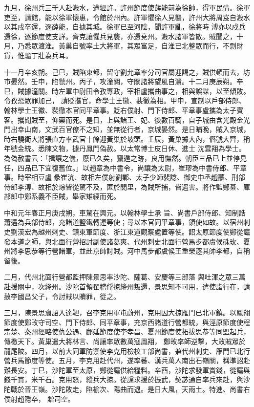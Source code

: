 \begin{pinyinscope}
 九月，徐州兵三千人赴溵水，途經許。許州節度使薛能前為徐帥，得軍民情。徐軍吏至，請館，能以徐軍懷惠，令館於州內。許軍懼徐人見襲，許州大將周岌自溵水以其戍卒還，逐薛能，自據其城。徐軍已至河陰，聞許軍亂，徐將時
 溥亦以戍兵還徐，逐節度使支詳。齊克讓懼兵見襲，亦還兗州。溵水諸軍皆散。賊聞之，十月，乃悉眾渡淮。黃巢自號率土大將軍，其眾富足，自淮已北整眾而行，不剽財貨，惟驅丁壯為兵耳。



 十一月辛亥朔。己巳，賊陷東都，留守劉允章率分司官屬迎謁之，賊供頓而去，坊市晏然。壬申，陷虢州。丙子，攻潼關，守關諸將望風自潰。十二月庚辰朔。辛巳，賊據潼關。時左軍中尉田令孜專政，宰相盧攜曲事之，相與誤謀，以至傾敗。令孜恐眾罪加己，
 請貶攜官，命學士王徽、裴徹為相。甲申，宣制以戶部侍郎、翰林學士王徽、裴徹本官同平章事。貶右僕射、門下侍郎、平章事盧攜為太子賓客。攜聞賊至，仰藥而死。是日，上與諸王、妃、後數百騎，自子城由含光殿金光門出幸山南，文武百官僚不之知，並無從行者，京城晏然。是日晡晚，賊入京城，時右驍衛大將張直方率武官十餘迎黃巢於坡頭。壬辰，黃巢據大內，僭號大齊，稱年號金統。悉陳文物，據丹鳳門偽赦。以太常博士皮日休、進士
 沈雲翔為學士。為偽赦書云：「揖讓之儀，廢已久矣，竄遁之跡，良用憮然。朝臣三品已上並停見任，四品已下宜復舊位。」以趙章為中書令，尚讓為太尉，崔璆為中書侍郎、平章事。時宰相豆盧彖崔沆、故相左僕射劉鄴、太子少師裴諗、御史中丞趙蒙、刑部侍郎李溥、故相於琮皆從駕不及，匿於閭里，為賊所捕，皆遇害。將作監鄭綦、庫部郎中鄭系義不臣賊，舉家雉經而死。



 中和元年春正月庚戌朔，車駕在興元。以翰林學士承
 旨、尚書戶部侍郎、知制誥蕭遘為兵部侍郎，充諸道鹽鐵轉運等使；尋以本官同平章事，領使如故。以宿州刺史劉漢宏為越州刺史、鎮東軍節度、浙江東道觀察處置等使。詔太原節度使鄭從讜發本道之師，與北面行營招討副使諸葛爽、代州刺史北面行營馬步都虞候硃玫、夏州將李思恭等行營諸軍，並赴京師討賊。河中馬步都虞候王重榮逐其帥李都，自稱留後。



 二月，代州北面行營都監押陳景思率沙陀、薩葛、安慶等三部落
 與吐渾之眾三萬赴援關中，次絳州。沙陀首領翟稽俘掠絳州叛還，景思知不可用，遣使詣行在，請赦李國昌父子，令討賊以贖罪，從之。



 三月，陳景思齎詔入達靼，召李克用軍屯蔚州，克用因大掠雁門已北軍鎮。以鳳翔節度使鄭畋守司空、門下侍郎、同平章事，充京西諸道行營都統，與涇原節度使程宗楚、秦州經略使仇公遇、鄜延節度使李孝昌、夏州節度使拓拔思恭等同盟起兵，傳檄天下。黃巢遣大將林言、尚讓率眾數萬寇鳳翔，
 鄭畋率師逆擊，大敗賊眾於龍尾陂。四月，以前大同軍防禦使李克用檢校工部尚書，兼代州刺史、雁門已北行營兵馬節度等使。五月，李克用赴代州，遂率蕃、漢兵萬人南出石嶺關，稱準詔赴難長安。丁巳，沙陀軍至太原，鄭從讜供給糧料。辛酉，沙陀求發軍賞錢，從讜與錢千貫，米千石。克用怒，縱兵大掠。從讜求援於振武，契苾通自率兵來赴，與沙陀戰於晉王嶺。沙陀敗走，陷榆次、陽曲而退。是日大風，天雨土。特進、尚書右僕射趙隱卒，
 贈司空。




\end{pinyinscope}
